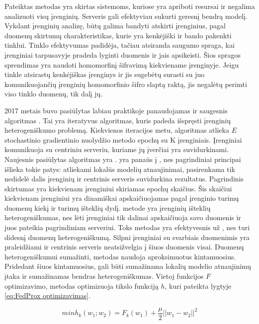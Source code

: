 \documentclass{VUMIFInfBakalaurinis}
\begin{document}
\par Pateiktas metodas yra skirtas sistemoms, kuriose yra apriboti resursai ir negalima analizuoti visų įrenginių. Serveris gali efektyviau sukurti geresnį bendrą modelį. Vykdant įrenginių analizę, būtų galima bandyti atskirti įrenginius, pagal duomenų skirtumų charakteristikas, kurie yra kenkėjiški ir bando pakenkti tinklui. Tinklo efektyvumas padidėja, tačiau atsiranda saugumo spraga, kai įrenginiai tarpusavyje pradeda lyginti duomenis ir jais apsikeisti. Šios spragos sprendimas yra naudoti homomorfinį šifravimą kiekviename įrenginyje. Jeigu tinkle atsirastų kenkėjiškas įrenginys ir jis sugebėtų surasti su juo komunikuojančių įrenginių homomorfinio šifro slaptą raktą, jis negalėtų perimti viso tinklo duomenų, tik dalį jų.
\par 2017 metais buvo pasiūlytas labiau praktikoje panaudojamas ir saugesnis  algoritmas \cite{21}. Tai yra iteratyvus algoritmas, kuris padeda išspręsti įrenginių heterogeniškumo problemą. Kiekvienos iteracijos metu, algoritmas atlieka $E$ stochastinio gradientinio nuolydžio metodo epochų su K įrenginiais. Įrenginiai komunikuoja su centriniu serveriu, kuriame jų įverčiai yra suvidurkinami. Naujesnis pasiūlytas algoritmas yra .  yra panaūs į , nes pagrindiniai principai išlieka tokie patys: atliekami lokalūs modelių atnaujinimai, pasirenkama tik nedidelė dalis įrenginių ir centrinis serveris suvidurkina rezultatus. Pagrindinis  skirtumas yra kiekvienam įrenginiui skiriamas epochų skaičius. Šis skaičiui kiekvienam įrenginiui yra dinamiškai apskaičiuojamas pagal įrenginio turimų duomenų kiekį ir turimų išteklių dydį.  metode yra įrenginių išteklių heterogeniškumas, nes lėti įrenginiai tik dalinai apskaičiuoja savo duomenis ir juos pateikia pagrindiniam serveriui. Toks metodas yra efektyvesnis už , nes  turi didesnį duomenų heterogeniškumą. Silpni įrenginiai su svarbiais duomenimis yra praleidžiami ir centrinis serveris neatsižvelgia į šiuos duomenis visai. Duomenų heterogeniškumui sumažinti,  metodas naudoja aproksimuotus kintamuosius. Pridedant šiuos kintamuosius, gali būti sumažinama lokalių modelio atnaujinimų įtaka ir sumažinamas bendras heterogeniškumas. Vietoj funkcijos $F$ optimizavimo, metodas optimizuoja tikslo funkciją $h$, kuri pateikta lygtyje \eqref{eq:FedProx optimizavimas}. 

\begin{equation}
    min h_{k}(w_{1}; w_{2}) = F_{k}(w_{1}) + \frac{\mu}{2}|| w_{1} - w_{2} ||^{2}
    \label{eq:FedProx optimizavimas}
\end{equation}
\end{document}

